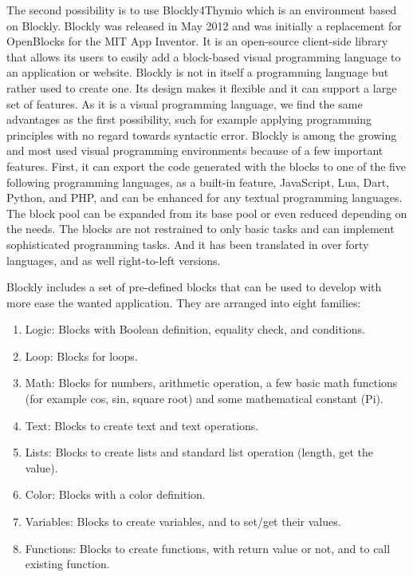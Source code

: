 \documentclass{scrartcl}
\begin{document}
The second possibility is to use Blockly4Thymio which is an environment based on Blockly. Blockly was released in May 2012 and was initially a replacement for OpenBlocks for the MIT App Inventor. 
It is an open-source client-side library that allows its users to easily add a block-based visual programming language to an application or website. 
Blockly is not in itself a programming language but rather used to create one. Its design makes it flexible and it can support a large set of features. 
As it is a visual programming language, we find the same advantages as the first possibility, such for example applying programming principles with no regard towards syntactic error.
Blockly is among the growing and most used visual programming environments because of a few important features. First, it can export the code generated with the blocks to one of the five following programming languages, 
as a built-in feature, JavaScript, Lua, Dart, Python, and PHP, and can be enhanced for any textual programming languages. 
The block pool can be expanded from its base pool or even reduced depending on the needs. The blocks are not restrained to only basic tasks and can implement sophisticated programming tasks. 
And it has been translated in over forty languages, and as well right-to-left versions.

Blockly includes a set of pre-defined blocks that can be used to develop with more ease the wanted application. They are arranged into eight families:
\begin{enumerate}
  \item Logic: Blocks with Boolean definition, equality check, and conditions.
  \item Loop: Blocks for loops.
  \item Math: Blocks for numbers, arithmetic operation, a few basic math functions (for example cos, sin, square root) and some mathematical constant (Pi).
  \item Text: Blocks to create text and text operations.
  \item Lists: Blocks to create lists and standard list operation (length, get the value).
  \item Color: Blocks with a color definition.
  \item Variables: Blocks to create variables, and to set/get their values.
  \item Functions: Blocks to create functions, with return value or not, and to call existing function.
\end{enumerate}
\end{document}
